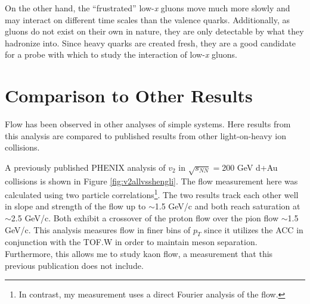 On the other hand, the ``frustrated'' low-\textit{x} gluons move much more slowly and may interact on different time scales than the valence quarks. Additionally, as gluons do not exist on their own in nature, they are only detectable by what they hadronize into. Since heavy quarks are created fresh, they are a good candidate for a probe with which to study the interaction of low-\textit{x} gluons.

\section{Comparison to Other Results}
Flow has been observed in other analyses of simple systems. Here results from this analysis are compared to published results from other light-on-heavy ion collisions.

A previously published PHENIX analysis of $v_2$ in $\sqrt{s_{NN}}=$200 GeV d+Au collisions is shown in Figure \ref{fig:v2allvsshengli}. The flow measurement here was calculated using two particle correlations\footnote{In contrast, my measurement uses a direct Fourier analysis of the flow.}. The two results track each other well in slope and strength of the flow up to $\sim$1.5 GeV/c and both reach saturation at $\sim$2.5 GeV/c. Both exhibit a crossover of the proton flow over the pion flow $\sim$1.5 GeV/c. This analysis measures flow in finer bins of $p_T$ since it utilizes the ACC in conjunction with the TOF.W in order to maintain meson separation.  Furthermore, this allows me to study kaon flow, a measurement that this previous publication does not include.

